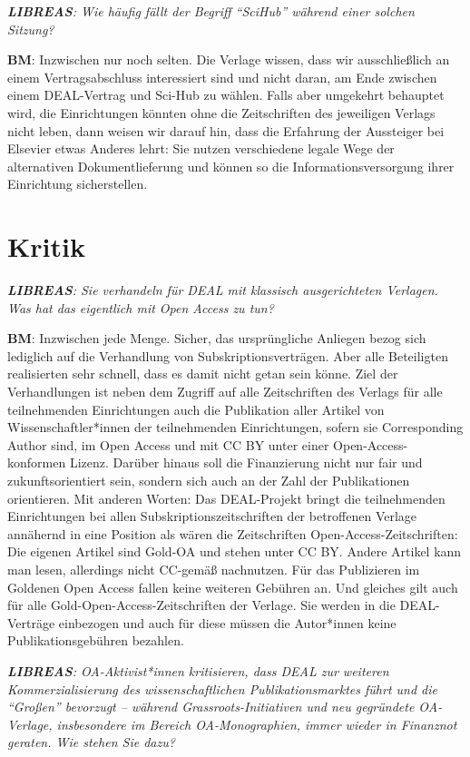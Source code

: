 \documentclass[a4paper,
fontsize=11pt,
oneside,
numbers=noperiodatend,
parskip=half-,
bibliography=totoc,
final
]{scrartcl}
\begin{document}
\emph{\textbf{LIBREAS}: Wie häufig fällt der Begriff \enquote{SciHub}
während einer solchen Sitzung?}

\textbf{BM}: Inzwischen nur noch selten. Die Verlage wissen, dass wir
ausschließlich an einem Vertragsabschluss interessiert sind und nicht
daran, am Ende zwischen einem DEAL-Vertrag und Sci-Hub zu wählen. Falls
aber umgekehrt behauptet wird, die Einrichtungen könnten ohne die
Zeitschriften des jeweiligen Verlags nicht leben, dann weisen wir darauf
hin, dass die Erfahrung der Aussteiger bei Elsevier etwas Anderes lehrt:
Sie nutzen verschiedene legale Wege der alternativen Dokumentlieferung
und können so die Informationsversorgung ihrer Einrichtung
sicherstellen.

\section{Kritik}\label{kritik}

\emph{\textbf{LIBREAS}: Sie verhandeln für DEAL mit klassisch
ausgerichteten Verlagen. Was hat das eigentlich mit Open Access zu tun?
}

\textbf{BM}: Inzwischen jede Menge. Sicher, das ursprüngliche Anliegen
bezog sich lediglich auf die Verhandlung von Subskriptionsverträgen.
Aber alle Beteiligten realisierten sehr schnell, dass es damit nicht
getan sein könne. Ziel der Verhandlungen ist neben dem Zugriff auf alle
Zeitschriften des Verlags für alle teilnehmenden Einrichtungen auch die
Publikation aller Artikel von Wissenschaftler*innen der teilnehmenden
Einrichtungen, sofern sie Corresponding Author sind, im Open Access und
mit CC BY unter einer Open-Access-konformen Lizenz. Darüber hinaus soll
die Finanzierung nicht nur fair und zukunftsorientiert sein, sondern
sich auch an der Zahl der Publikationen orientieren. Mit anderen Worten:
Das DEAL-Projekt bringt die teilnehmenden Einrichtungen bei allen
Subskriptionszeitschriften der betroffenen Verlage annähernd in eine
Position als wären die Zeitschriften Open-Access-Zeitschriften: Die
eigenen Artikel sind Gold-OA und stehen unter CC BY. Andere Artikel kann
man lesen, allerdings nicht CC-gemäß nachnutzen. Für das Publizieren im
Goldenen Open Access fallen keine weiteren Gebühren an. Und gleiches
gilt auch für alle Gold-Open-Access-Zeitschriften der Verlage. Sie
werden in die DEAL-Verträge einbezogen und auch für diese müssen die
Autor*innen keine Publikationsgebühren bezahlen.

\emph{\textbf{LIBREAS}: OA-Aktivist*innen kritisieren, dass DEAL zur
weiteren Kommerzialisierung des wissenschaftlichen Publikationsmarktes
führt und die \enquote{Großen} bevorzugt -- während
Grassroots-Initiativen und neu gegründete OA-Verlage, insbesondere im
Bereich OA-Monographien, immer wieder in Finanznot geraten. Wie stehen
Sie dazu?}
\end{document}
